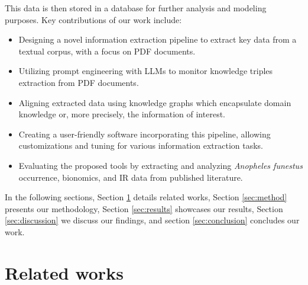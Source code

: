 \documentclass{article}
\begin{document}
This data is then stored in a database for further analysis and modeling purposes. 
Key contributions of our work include:
\begin{itemize}
\item Designing a novel information extraction pipeline to extract key data from a textual corpus, with a focus on PDF documents.
\item Utilizing prompt engineering with LLMs to monitor knowledge triples extraction from PDF documents.
\item Aligning extracted data using knowledge graphs which encapsulate domain knowledge or, more precisely, the information of interest.
\item Creating a user-friendly software incorporating this pipeline, allowing customizations and tuning for various information extraction tasks.
\item Evaluating the proposed tools by extracting and analyzing \textit{Anopheles funestus} occurrence, bionomics, and IR data from published literature.
\end{itemize}
\par
In the following sections, Section \ref{sec:related_works} details related works, Section \ref{sec:method} presents our methodology, Section \ref{sec:results} showcases our results, Section \ref{sec:discussion} we discuss our findings, and section \ref{sec:conclusion} concludes our work.


\section{Related works}\label{sec:related_works}
\end{document}
